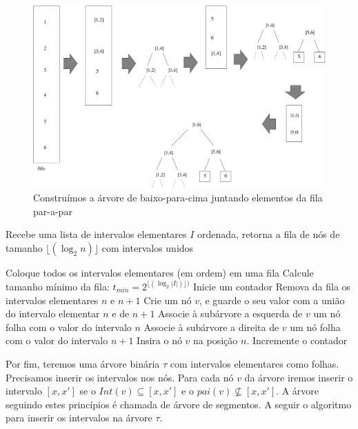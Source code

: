 \begin{figure}[h!]
    \centering
    \includegraphics[scale=0.55]{images/fifo_update.pdf}
    \caption{Construímos a árvore de baixo-para-cima juntando elementos da fila par-a-par}
    \label{fig:building-bottom-up}
\end{figure}

\begin{algorithm}[h!]
    \caption{Recebe uma lista de intervalos elementares $I$ ordenada, retorna a fila de nós de tamanho $\lfloor(\log_2n)\rfloor$ com intervalos unidos}
    \begin{algorithmic}[1]
            \State Coloque todos os intervalos elementares (em ordem) em uma fila 
            \State Calcule tamanho mínimo da fila: $t_{min} = 2^{\lfloor(\log_2{|I|})\rfloor)}$
            \State Inicie um contador
                \State Remova da fila os intervalos elementares $n$ e $n+1$
                \State Crie um nó $v$, e guarde o seu valor com a união do intervalo elementar $n$ e de $n+1$
                \State Associe à subárvore a esquerda de $v$ um nó folha com o valor do intervalo $n$
                \State Associe à subárvore a direita de $v$ um nó folha com o valor do intervalo $n+1$
                \State Insira o nó $v$ na posição $n$.
                \State Incremente o contador
            \EndWhile
        \EndFunction
    \end{algorithmic}
\end{algorithm}
 Por fim, teremos uma árvore binária $\tau$ com intervalos elementares como folhas. Precisamos inserir os intervalos nos nós. Para cada nó $v$ da árvore iremos inserir o intervalo $[x, x']$ se o $Int(v) \subseteq [x, x']$ e o $pai(v) \nsubseteq [x, x']$. A árvore seguindo estes princípios é chamada de árvore de segmentos.  A seguir o algoritmo para inserir os intervalos na árvore $\tau$.
 
